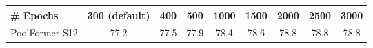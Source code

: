 \begin{tabular}{l c c c c c c c c}
\toprule
\# Epochs & 300 (default) & 400 & 500 & 1000 & 1500 & 2000 & 2500 & 3000 \\
\midrule
PoolFormer-S12 & 77.2 & 77.5 & 77.9 & 78.4 & 78.6 & 78.8 & 78.8 & 78.8 \\
\bottomrule
\end{tabular}